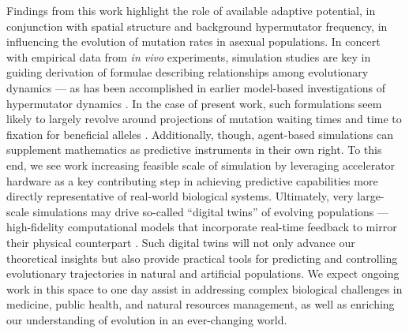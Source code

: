 Findings from this work highlight the role of available adaptive potential, in conjunction with spatial structure and background hypermutator frequency, in influencing the evolution of mutation rates in asexual populations.
In concert with empirical data from \textit{in vivo} experiments, simulation studies are key in guiding derivation of formulae describing relationships among evolutionary dynamics — as has been accomplished in earlier model-based investigations of hypermutator dynamics \citep{raynes2018sign,raynes2019migration,raynes2019selection}.
In the case of present work, such formulations seem likely to largely revolve around projections of mutation waiting times and time to fixation for beneficial alleles \citep{ribeck2016competition}.
Additionally, though, agent-based simulations can supplement mathematics as predictive instruments in their own right.
To this end, we see work increasing feasible scale of simulation by leveraging accelerator hardware as a key contributing step in achieving predictive capabilities more directly representative of real-world biological systems.
Ultimately, very large-scale simulations may drive so-called ``digital twins'' of evolving populations --- high-fidelity computational models that incorporate real-time feedback to mirror their physical counterpart \citep{dekoning2023digital}.
Such digital twins will not only advance our theoretical insights but also provide practical tools for predicting and controlling evolutionary trajectories in natural and artificial populations.
We expect ongoing work in this space to one day assist in addressing complex biological challenges in medicine, public health, and natural resources management, as well as enriching our understanding of evolution in an ever-changing world.
